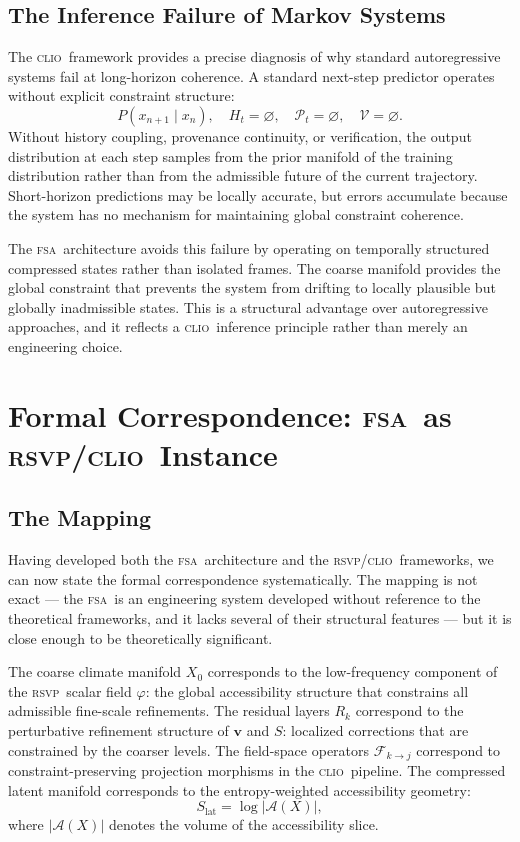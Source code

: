 \documentclass[11pt,a4paper]{article}
\theoremstyle{plain}
\theoremstyle{definition}
\theoremstyle{remark}
\newcommand{\A}{\mathcal{A}}
\newcommand{\Pp}{\mathcal{P}}
\newcommand{\RSVP}{\textup{\textsc{rsvp}}}
\newcommand{\CLIO}{\textup{\textsc{clio}}}
\newcommand{\FSA}{\textup{\textsc{fsa}}}
\begin{document}
\subsection{The Inference Failure of Markov Systems}

The \CLIO\ framework provides a precise diagnosis of why standard
autoregressive systems fail at long-horizon coherence. A standard
next-step predictor operates without explicit constraint structure:
\[
P(x_{n+1} \mid x_n),
\quad H_t = \varnothing,
\quad \Pp_t = \varnothing,
\quad \mathcal{V} = \varnothing.
\]
Without history coupling, provenance continuity, or verification, the
output distribution at each step samples from the prior manifold of the
training distribution rather than from the admissible future of the current
trajectory. Short-horizon predictions may be locally accurate, but errors
accumulate because the system has no mechanism for maintaining global
constraint coherence.

The \FSA\ architecture avoids this failure by operating on temporally
structured compressed states rather than isolated frames. The coarse
manifold provides the global constraint that prevents the system from
drifting to locally plausible but globally inadmissible states. This is a
structural advantage over autoregressive approaches, and it reflects a
\CLIO\ inference principle rather than merely an engineering choice.

\section{Formal Correspondence: \FSA\ as \RSVP/\CLIO\ Instance}
\label{sec:correspondence}

\subsection{The Mapping}

Having developed both the \FSA\ architecture and the \RSVP/\CLIO\
frameworks, we can now state the formal correspondence systematically.
The mapping is not exact --- the \FSA\ is an engineering system developed
without reference to the theoretical frameworks, and it lacks several of
their structural features --- but it is close enough to be theoretically
significant.

The coarse climate manifold $X_0$ corresponds to the low-frequency
component of the \RSVP\ scalar field $\varphi$: the global accessibility
structure that constrains all admissible fine-scale refinements. The
residual layers $R_k$ correspond to the perturbative refinement structure
of $\mathbf{v}$ and $S$: localized corrections that are constrained by
the coarser levels. The field-space operators $\mathcal{F}_{k \to j}$
correspond to constraint-preserving projection morphisms in the \CLIO\
pipeline. The compressed latent manifold corresponds to the entropy-weighted
accessibility geometry:
\[
S_{\mathrm{lat}} = \log \bigl|\A(X)\bigr|,
\]
where $|\A(X)|$ denotes the volume of the accessibility slice.
\end{document}
